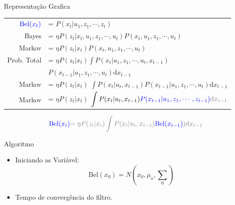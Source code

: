 Representação Grafica
    



\begin{tabular}{r l}
    $\color{blue}{\text{Bel}}(x_t)$ & = $P(x_t| u_1, z_1,  \cdots, z_t)$ \\
    Bayes & = $\eta P(z_t|x_t,  u_1, z_1,  \cdots,  u_t)P(x_t, u_1, z_1, \cdots, u_t)$ \\
    Markov & = $\eta P(z_t|x_t)P(x_t, u_1, z_1, \cdots, u_t)$ \\
    Prob. Total & = $\eta P(z_t|x_t)\displaystyle\int P(x_t| u_1, z_1, \cdots, u_t,x_{t-1})$ \\
                &  \quad \quad \quad $P(x_{t-1}| u_1, z_1, \cdots, u_t)\text{d}x_{t-1}$\\
    Markov & = $\eta P(z_t|x_t)$ $\displaystyle\int P(x_t| u_t,x_{t-1})P(x_{t-1}| u_1, z_1, \cdots, u_t)\text{d}x_{t-1}$ \\
    Markov & = $\eta P(z_t|x_t)$ $\displaystyle\int P(x_t| u_t,x_{t-1})\color{blue}{P(x_{t-1}| u_1, z_1, \cdots, z_{t-1}})\color{gray}{\text{d}x_{t-1}}$ \\
\end{tabular}   

\begin{equation*}
    \color{blue}{\text{Bel}}(x_t)  \color{gray}{=\eta P(z_t|x_t)\displaystyle\int P(x_t| u_t,x_{t-1})}\color{blue}{\color{blue}{\text{Bel}}(x_{t-1})}\color{gray}{)\text{d}x_{t-1}}
\end{equation*}

Algoritmo
\begin{itemize}
    \item Iniciando as Variável:
    \begin{equation}
        \text{Bel}(x_0) = N\left(x_0, \mu_o, {\textstyle\sum} _0\right)
    \end{equation}
    \item Tempo de convergência do filtro.
\end{itemize}



